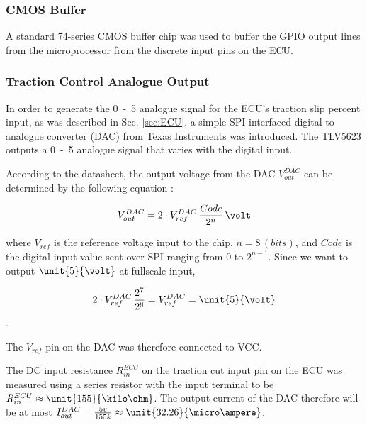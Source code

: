 \subsubsection{CMOS Buffer}

A standard 74-series CMOS buffer chip was used to buffer the GPIO output lines from the microprocessor from the discrete input pins on the ECU.

\subsubsection{Traction Control Analogue Output}

In order to generate the \unit{0-5}{\volt} analogue signal for the ECU's traction slip percent input, as was described in Sec. \ref{sec:ECU}, a simple SPI interfaced digital to analogue converter (DAC) from Texas Instruments was introduced. The TLV5623 outputs a \unit{0-5}{\volt} analogue signal that varies with the digital input.

According to the datasheet, the output voltage from the DAC $V_{out}^{DAC}$ can be determined by the following equation \cite{TLV5623}:

\begin{equation}
V_{out}^{DAC}=2\cdot{V_{ref}^{DAC}}\,\frac{Code}{2^{n}}\,\volt
\end{equation}

where $V_{ref}$ is the reference voltage input to the chip, $n=8\,(bits)$, and $Code$ is the digital input value sent over SPI ranging from $0$ to $2^{n-1}$. Since we want to output $\unit{5}{\volt}$ at fullscale input,

\begin{equation}
2\cdot{V_{ref}^{DAC}}\,\frac{2^{7}}{2^{8}}=V_{ref}^{DAC}=\unit{5}{\volt}
\end{equation}.

The $V_{ref}$ pin on the DAC was therefore connected to VCC.

The DC input resistance $R_{in}^{ECU}$ on the traction cut input pin on the ECU was measured using a series resistor with the input terminal to be $R_{in}^{ECU}\approx\unit{155}{\kilo\ohm}$. The output current of the DAC therefore will be at most $I_{out}^{DAC}=\frac{5v}{155k}\approx\unit{32.26}{\micro\ampere}$.

